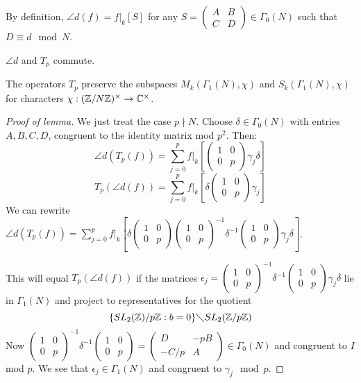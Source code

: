 \documentclass[10pt,a4paper]{article}
\begin{document}
By definition, $\angle{d}(f) = f|_k[S]$ for any $S =\begin{pmatrix}A&B\\C&D\end{pmatrix} \in \Gamma_0(N)$ such that $D \equiv d \mod N$.

\begin{lemma}
  $\angle{d}$ and $T_p$ commute.
\end{lemma}
\begin{corollary}
  The operators $T_p$ preserve the subspaces $M_k(\Gamma_1(N), \chi)$ and $S_k(\Gamma_1(N), \chi)$ for characters $\chi : (\mathbb{Z}/N\mathbb{Z})^\times \to \mathbb{C}^\times$.
\end{corollary}
\begin{proof}[Proof of lemma]
  We just treat the case $p \nmid N$. Choose $\delta \in \Gamma_0(N)$ with entries $A,B,C,D$, congruent to the identity matrix mod $p^2$. Then:
  \[\angle{d}(T_p(f)) = \sum_{j=0}^p f|_k[\begin{pmatrix}1&0\\0&p \end{pmatrix}\gamma_j \delta]\]
  \[T_p(\angle{d}(f)) = \sum_{j=0}^p f|_k[\delta\begin{pmatrix}1&0\\0&p \end{pmatrix}\gamma_j ]\]
  We can rewrite $\angle{d}(T_p(f)) = \sum_{j=0}^p f|_k [\delta \begin{pmatrix}1&0\\0&p\end{pmatrix}\begin{pmatrix}1&0\\0&p\end{pmatrix}^{-1}\delta^{-1}\begin{pmatrix}1&0\\0&p\end{pmatrix}\gamma_j \delta]$.

  This will equal $T_p(\angle{d}(f))$ if the matrices $\epsilon_j = \begin{pmatrix}1&0\\0&p\end{pmatrix}^{-1}\delta^{-1}\begin{pmatrix}1&0\\0&p\end{pmatrix}\gamma_j \delta$ lie in $\Gamma_1(N)$ and project to representatives for the quotient
  \[\{SL_2(\mathbb{Z})/p\mathbb{Z} : b = 0\} \diagdown SL_2(\mathbb{Z}/p\mathbb{Z})\]
  Now $\begin{pmatrix}1&0\\0&p\end{pmatrix}^{-1}\delta^{-1}\begin{pmatrix}1&0\\0&p\end{pmatrix} = \begin{pmatrix}D & -pB\\ -C/p & A \end{pmatrix} \in \Gamma_0(N)$ and congruent to $I$ mod $p$. We see that $\epsilon_j \in \Gamma_1(N)$ and congruent to $\gamma_j \mod p$.
\end{proof}
\end{document}
